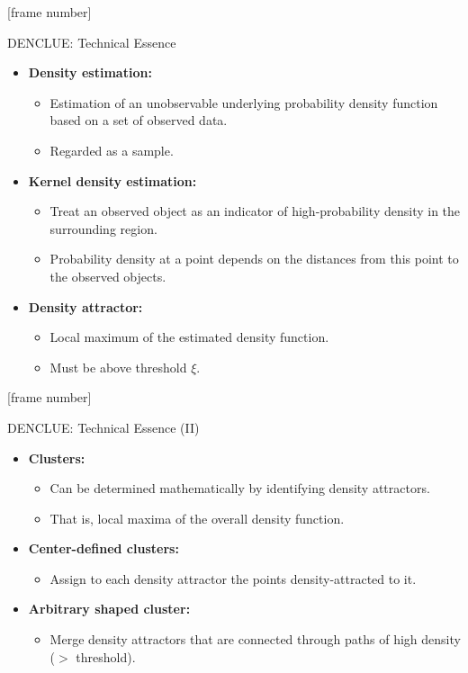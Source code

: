 \documentclass[aspectratio=169,t,xcolor=dvipsnames]{beamer}
\begin{document}
  {
    [frame number]
    \begin{frame}{DENCLUE: Technical Essence}
      \begin{itemize}
        \item \textbf{Density estimation:}
        \begin{itemize}
          \item Estimation of an unobservable underlying probability density function based on a set of observed data.
          \item Regarded as a sample.
        \end{itemize}
        \item \textbf{Kernel density estimation:}
        \begin{itemize}
          \item Treat an observed object as an indicator of high-probability density in the surrounding region.
          \item Probability density at a point depends on the distances from this point to the observed objects.
        \end{itemize}
        \item \textbf{Density attractor:}
        \begin{itemize}
          \item Local maximum of the estimated density function.
          \item Must be above threshold $\xi$.
        \end{itemize}
      \end{itemize}
    \end{frame}
  }

  {
    [frame number]
    \begin{frame}{DENCLUE: Technical Essence (II)}
      \begin{itemize}
        \item \textbf{Clusters:}
        \begin{itemize}
          \item Can be determined mathematically by identifying density attractors.
          \item That is, local maxima of the overall density function.
        \end{itemize}
        \item \textbf{Center-defined clusters:}
        \begin{itemize}
          \item Assign to each density attractor the points density-attracted to it.
        \end{itemize}
        \item \textbf{Arbitrary shaped cluster:}
        \begin{itemize}
          \item Merge density attractors that are connected through paths of high density ($>$ threshold).
        \end{itemize}
      \end{itemize}
    \end{frame}
  }
\end{document}
